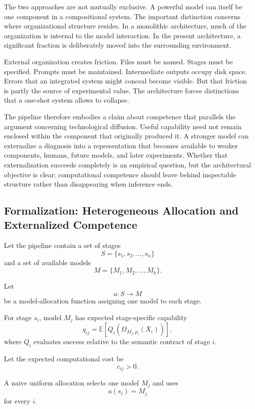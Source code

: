 \documentclass[11pt]{article}
\begin{document}
The two approaches are not mutually exclusive. A powerful model can itself be one component in a compositional system. The important distinction concerns where organizational structure resides. In a monolithic architecture, much of the organization is internal to the model interaction. In the present architecture, a significant fraction is deliberately moved into the surrounding environment.

External organization creates friction. Files must be named. Stages must be specified. Prompts must be maintained. Intermediate outputs occupy disk space. Errors that an integrated system might conceal become visible. But that friction is partly the source of experimental value. The architecture forces distinctions that a one-shot system allows to collapse.

The pipeline therefore embodies a claim about competence that parallels the argument concerning technological diffusion. Useful capability need not remain enclosed within the component that originally produced it. A stronger model can externalize a diagnosis into a representation that becomes available to weaker components, humans, future models, and later experiments. Whether that externalization succeeds completely is an empirical question, but the architectural objective is clear: computational competence should leave behind inspectable structure rather than disappearing when inference ends.

\subsection{Formalization: Heterogeneous Allocation and Externalized Competence}

Let the pipeline contain a set of stages
\[
    S=\{s_1,s_2,\ldots,s_n\}
\]
and a set of available models
\[
    M=\{M_1,M_2,\ldots,M_k\}.
\]

Let
\[
    a:S\rightarrow M
\]
be a model-allocation function assigning one model to each stage.

For stage \(s_i\), model \(M_j\) has expected stage-specific capability
\[
    q_{ij}
    =
    \mathbb{E}
    \left[
        Q_i(
            \Omega_{M_j,p_i}(X_i)
        )
    \right],
\]
where \(Q_i\) evaluates success relative to the semantic contract of stage \(i\).

Let the expected computational cost be
\[
    c_{ij}>0.
\]

A naive uniform allocation selects one model \(M_j\) and uses
\[
    a(s_i)=M_j
\]
for every \(i\).
\end{document}
